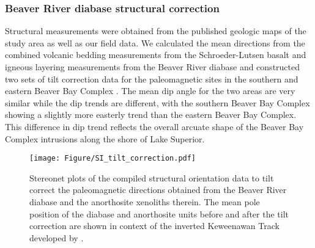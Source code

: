 \documentclass[11pt,letterpaper]{article}
\begin{document}


\subsubsection*{Beaver River diabase structural correction}

Structural measurements were obtained from the published geologic maps of the study area as well as our field data. We calculated the mean directions from the combined volcanic bedding measurements from the Schroeder-Lutsen basalt and igneous layering measurements from the Beaver River diabase and constructed two sets of tilt correction data for the paleomagnetic sites in the southern and eastern Beaver Bay Complex \citep{Boerboom2004a, Boerboom2006a, Boerboom2006b, Boerboom2007a, Miller2001a}. The mean dip angle for the two areas are very similar while the dip trends are different, with the southern Beaver Bay Complex showing a slightly more easterly trend than the eastern Beaver Bay Complex. This difference in dip trend reflects the overall arcuate shape of the Beaver Bay Complex intrusions along the shore of Lake Superior. 

\begin{figure}[h!]
\noindent\texttt{[image: Figure/SI\_tilt\_correction.pdf]}
\centering
\caption{\footnotesize{Stereonet plots of the compiled structural orientation data to tilt correct the paleomagnetic directions obtained from the Beaver River diabase and the anorthosite xenoliths therein. The mean pole position of the diabase and anorthosite units before and after the tilt correction are shown in context of the inverted Keweenawan Track developed by \cite{Swanson-Hysell2019a}.}}
\label{fig:tilt_correction}
\end{figure}
\end{document}
